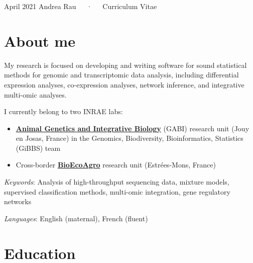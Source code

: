 \documentclass[11pt, a4paper]{awesome-cv}
\providecommand{\tightlist}{%
	\setlength{\itemsep}{0pt}\setlength{\parskip}{0pt}}
\begin{document}
\makecvheader

\makecvfooter
  {April 2021}
    {Andrea Rau~~~·~~~Curriculum Vitae}
  {\thepage}





\hypertarget{about-me}{%
\section{About me}\label{about-me}}

My research is focused on developing and writing software for sound
statistical methods for genomic and transcriptomic data analysis,
including differential expression analyses, co-expression analyses,
network inference, and integrative multi-omic analyses.

I currently belong to two INRAE labs:

\begin{itemize}
\tightlist
\item
  \href{https://www6.jouy.inra.fr/gabi_eng/}{\textbf{Animal Genetics and
  Integrative Biology}} (GABI) research unit (Jouy en Josas, France) in
  the Genomics, Biodiversity, Bioinformatics, Statistics (GiBBS) team\\
\item
  Cross-border \href{https://www.bioecoagro.eu/}{\textbf{BioEcoAgro}}
  research unit (Estrées-Mons, France)
\end{itemize}

\emph{Keywords}: Analysis of high-throughput sequencing data, mixture
models, supervised classification methods, multi-omic integration, gene
regulatory networks

\emph{Languages}: English (maternal), French (fluent)

\hypertarget{education}{%
\section{Education}\label{education}}
\end{document}
